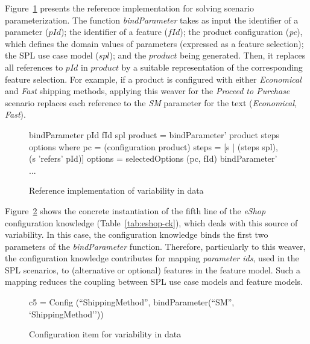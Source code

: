 

Figure~\ref{fig:ri-vd} presents the reference implementation for solving scenario
parameterization. The function \emph{bindParameter} takes as input the identifier
of a parameter ($pId$); the identifier of a feature ($fId$); the product
configuration (\emph{pc}), which defines the domain values of parameters
(expressed as a feature selection); the SPL use case model ($spl$); and the
$product$ being generated. Then, it replaces all references to $pId$ in 
$product$ by a suitable representation of the corresponding feature selection.
For example, if a product is configured with either \emph{Economical} and \emph{Fast}
shipping methods, applying this weaver for the \emph{Proceed to
Purchase} scenario replaces each reference to the \emph{SM} parameter for 
the text (\emph{Economical, Fast}).


\begin{figure}
\begin{code}
bindParameter pId fId spl product = 
  bindParameter' product steps options 
  where
    pc = (configuration product)
    steps = [s | (steps spl), (s 'refers' pId)]
    options = selectedOptions (pc, fId)   
    bindParameter' ...
\end{code}   	
\caption{Reference implementation of variability in data}
\label{fig:ri-vd} 
\end{figure}

Figure~\ref{fig:ci-vd} shows the concrete instantiation of the fifth line of
the \emph{eShop} configuration knowledge (Table~\ref{tab:eshop-ck}), which deals 
with this source of variability. In this case, the configuration knowledge
binds the first two parameters of the \emph{bindParameter} function. Therefore, 
particularly to this weaver, the configuration knowledge contributes for 
mapping \emph{parameter ids}, used in the SPL scenarios, to (alternative
or optional) features in the feature model. Such a mapping reduces the
coupling between SPL use case models and feature models.

\begin{figure}[hbt]
\begin{small}
\begin{code}
c5 = Config (``ShippingMethod'', bindParameter(``SM'', `ShippingMethod''))
\end{code}
\end{small}
\caption{Configuration item for variability in data}
\label{fig:ci-vd}
\end{figure}

